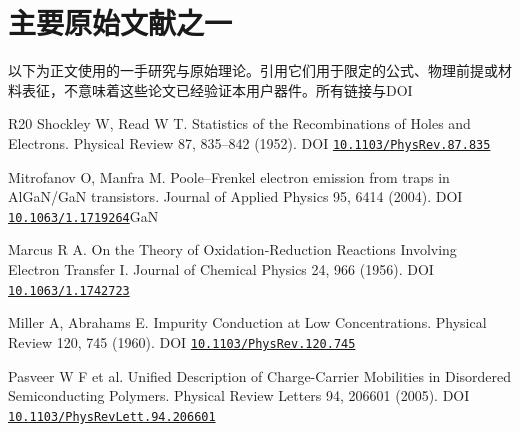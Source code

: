 \section{{\cjkfont 主要原始文献之一}\allowbreak{}}\label{sec:61}
{\cjkfont 以下为正文使用的一手研究与原始理论。引用它们用于限定的公式、物理前提或材料表征，不意味着这些论文已经验证本用户器件。所有链接与}\allowbreak{}DOI\allowbreak{}
\par
\begin{thebibliography}{R20}
 Shockley W, Read W T. Statistics of the Recombinations of Holes and Electrons. Physical Review 87, 835–842 (1952). DOI \href{https://doi.org/10.1103/PhysRev.87.835}{\nolinkurl{10.1103/PhysRev.87.835}}\allowbreak{}
\par
 Mitrofanov O, Manfra M. Poole–Frenkel electron emission from traps in AlGaN/GaN transistors. Journal of Applied Physics 95, 6414 (2004). DOI \href{https://doi.org/10.1063/1.1719264}{\nolinkurl{10.1063/1.1719264}}\allowbreak{}GaN\allowbreak{}
\par
 Marcus R A. On the Theory of Oxidation-Reduction Reactions Involving Electron Transfer I. Journal of Chemical Physics 24, 966 (1956). DOI \href{https://doi.org/10.1063/1.1742723}{\nolinkurl{10.1063/1.1742723}}\allowbreak{}
\par
 Miller A, Abrahams E. Impurity Conduction at Low Concentrations. Physical Review 120, 745 (1960). DOI \href{https://doi.org/10.1103/PhysRev.120.745}{\nolinkurl{10.1103/PhysRev.120.745}}\allowbreak{}
\par
 Pasveer W F et al. Unified Description of Charge-Carrier Mobilities in Disordered Semiconducting Polymers. Physical Review Letters 94, 206601 (2005). DOI \href{https://doi.org/10.1103/PhysRevLett.94.206601}{\nolinkurl{10.1103/PhysRevLett.94.206601}}\allowbreak{}

\end{thebibliography}
